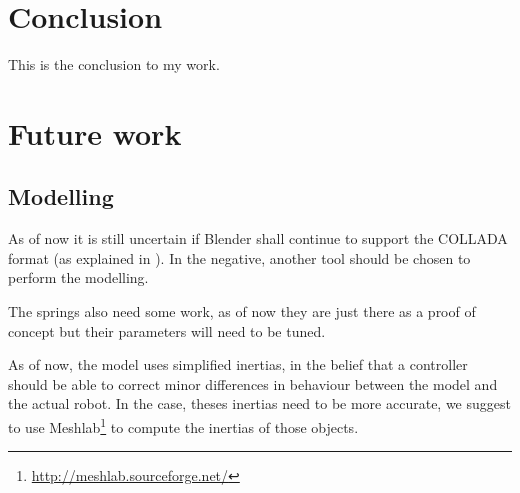 \section{Conclusion}
This is the conclusion to my work.

\section{Future work}
\subsection{Modelling}
As of now it is still uncertain if Blender shall continue to support the COLLADA format (as explained in \cite{blender_roadmap}). In the negative, another tool should be chosen to perform the modelling.

The springs also need some work, as of now they are just there as a proof of concept but their parameters will need to be tuned.

As of now, the model uses simplified inertias, in the belief that a controller should be able to correct minor differences in behaviour between the model and the actual robot. In the case, theses inertias need to be more accurate, we suggest to use Meshlab\footnote{\url{http://meshlab.sourceforge.net/}} to compute the inertias of those objects.
